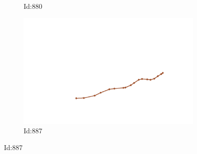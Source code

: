 \documentclass[12pt,twoside]{report}
\begin{document}
\begin{figure}
\begin{subfigure}[b]{0.20\textwidth}
\caption{Id:880}
\end{subfigure}
\begin{subfigure}[b]{0.20\textwidth}
\centering
\includegraphics[width=\textwidth]{../trajectories/887.png}
\caption{Id:887}
\end{subfigure}
\end{figure}
\end{document}
